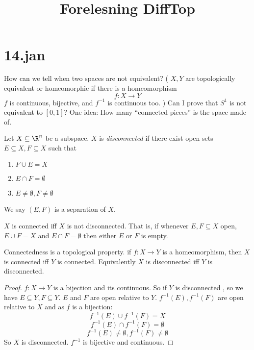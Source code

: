 \title{Forelesning DiffTop}
\maketitle
\section{14.jan}

How can we tell when two spaces are not equivalent?
(
$X,Y$ are topologically equivalent or homeomorphic if there is a homeomorphism
$$f:X\to Y$$
$f$ is continuous, bijective, and $f^{-1}$ is continuous too.
)
\newline
Can I prove that $S^1$ is not equivalent to $[0,1]$?
One idea: How many ``connected pieces''  is the space made of.

\begin{definition}
  Let $X\subseteq \R^n$ be a subspace. $X$ is \emph{disconnected} if there exist open sets $E\subseteq X, F\subseteq X$ such that
    \begin{enumerate}
      \item $F \cup E = X$
      \item $E \cap F = \emptyset$
      \item $E\neq \emptyset, F\neq \emptyset$
    \end{enumerate}
  We say $(E,F)$ is a separation of $X$.
\end{definition}

\begin{definition}
  $X$ is connected iff $X$ is not disconnected.
  \newline
  That is, if whenever $E,F \subseteq X$ open, $E\cup F=X$ and $E\cap F=\emptyset$ then either $E$ or $F$ is empty.
\end{definition}

\begin{theorem}
  Connectedness is a topological property.
  \newline
  if $f:X \to Y$ is a homeomorphism, then $X$ is connected iff $Y$ is connected. Equivalently $X$ is disconnected iff $Y$ is disconnected.
\end{theorem}
\begin{proof}
  $f:X\to Y$ is a bijection and its continuous. So if $Y$ is disconnected , so we have $E \subseteq Y, F\subseteq Y$. $E$ and $F$ are open relative to $Y$. $f^{-1}(E), f^{-1}(F)$ are open relative to $X$ and as $f$ is a bijection:
  $$f^{-1}(E)\cup f^{-1}(F)=X$$
  $$f^{-1}(E)\cap f^{-1}(F)= \emptyset$$
  $$f^{-1}(E)\neq \emptyset, f^{-1}(F)\neq \emptyset$$
  So $X$ is disconnected. $f^{-1}$ is bijective and continuous.
  \qedhere
\end{proof}

